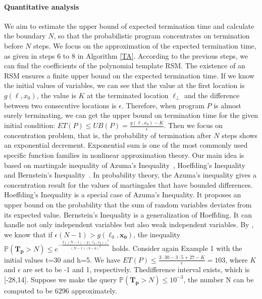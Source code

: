 \documentclass[sigconf,review, anonymous]{acmart}
\begin{document}
\paragraph{Quantitative analysis} We aim to estimate the upper bound of expected termination time and calculate the boundary $N$, so that the probabilistic program concentrates on termination before $N$ steps. 
We focus on the approximation of the expected termination time, as given in steps 6 to 8 in Algorithm \ref{TA}. According to the previous steps, we can find the coefficients of the polynomial template RSM. The existence of an RSM ensures a finite upper bound on the expected termination time. If we know the initial values of variables, we can see that the value at the first location is $g(\ell, x_0)$, the value is $K$ at the terminated location $\ell_\bot$ and the difference between two consecutive locations is $\epsilon$.  Therefore, when program $P$ is almost surely terminating, we can get the upper bound on termination time for the given initial condition: $ET(P) \leq UB(P) = \frac{g(\ell, x_0)-K}{\epsilon}$. 
Then we focus on concentration problem, that is, the probability of termination after $N$ steps shows an exponential decrement. Exponential sum is one of the most commonly used specific function families in nonlinear approximation theory. Our main idea is based on martingale inequality of Azuma's Inequality~\cite{Azuma1967}, Hoeffding's Inequality~\cite{Hoeffding1963,McDiarmid1998Concentration}  and Bernstein's Inequality~\cite{Bennett1962,McDiarmid1998Concentration}. In probability theory, the Azuma's inequality gives a concentration result for the values of martingales that have bounded differences. Hoeffding's Inequality is a special case of Azuma's Inequality. It proposes an upper bound on the probability that the sum of random variables deviates from its expected value. Bernstein's Inequality is a generalization of Hoeffding. It can handle not only independent variables but also weak independent variables. By \cite{cha2015algorithmic}, we know that if $\epsilon(N-1) > g(\ell_0,\boldsymbol{x_0})$, the inequality $\mathbb{P}(\bm{T_p} > N)\leq e^{-\frac{2((N-1)-g(\ell_0,x_0))^2}{(N-1)(b-a)^2}}$ holds. 
Consider again Example 1 with the initial values t=30 and h=5. We have  $ET(P) \leq \frac{3\cdot 30-3\cdot 5+27-K}{\epsilon}=103$, where $K$ and $\epsilon$ are set to be -1 and 1, respectively. Thedifference interval exists, which is [-28,14]. Suppose we make the query $\mathbb{P}(\bm{T_p} > N)\leq 10^{-3}$, the number N can be computed to be 6296  approximately.
\end{document}
